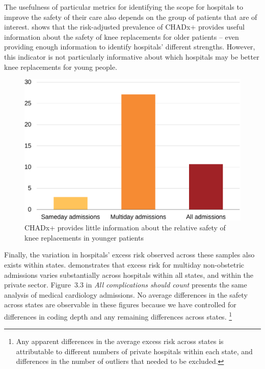 \documentclass[submission]{grattan}
\newcommand*{\Figure}[1]{Figure~#1}
\newcommand*{\myTitle}{All complications should count}
\begin{document}
The usefulness of particular metrics for identifying the scope for hospitals to improve the safety of their care also depends on the group of patients that are of interest.  shows that the risk-adjusted prevalence of CHADx+ provides useful information about the safety of knee replacements for older patients -- even providing enough information to identify hospitals' different strengths.
However, this indicator is not particularly informative about which hospitals may be better knee replacements for young people.



\begin{figure}
\caption{CHADx+ provides little information about the relative safety of knee replacements in younger patients}\label{fig:CHADXp-provides-little-info-about-relative-safety-of-knee-replacements-in-young-patients}
\includegraphics[page=31]{atlas/comps_charts.pdf}
\end{figure}

Finally, the variation in hospitals' excess risk observed across these samples also exists within states.  demonstrates that excess risk for multiday non-obstetric admissions varies substantially across hospitals within all states, and within the private sector.
\Figure{3.3} in \textit{\myTitle} presents the same analysis of medical cardiology admissions.
No average differences in the safety across states are observable in these figures because we have controlled for differences in coding depth and any remaining differences across states.%
\footnote{Any apparent differences in the average excess risk across states is attributable to different numbers of private hospitals within each state, and differences in the number of outliers that needed to be excluded.}
\end{document}
